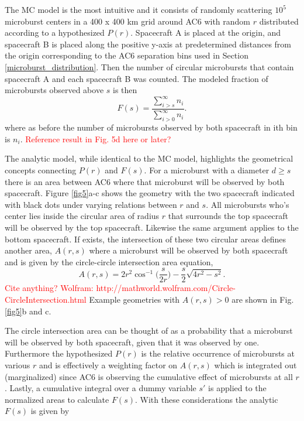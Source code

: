 \documentclass[draft]{agujournal2019}
\begin{document}
The MC model is the most intuitive and it consists of randomly scattering $10^5$ microburst centers in a 400 x 400 km grid around AC6 with random $r$ distributed according to a hypothesized $P(r)$. Spacecraft A is placed at the origin, and spacecraft B is placed along the positive y-axis at predetermined distances from the origin corresponding to the AC6 separation bins used in Section \ref{microburst_distribution}. Then the number of circular microbursts that contain spacecraft A and each spacecraft B was counted. The modeled fraction of microbursts observed above $s$ is then
\begin{equation}
F(s) = \frac{\displaystyle\sum_{i > s}^\infty n_{i} }{ \displaystyle\sum_{i > 0}^\infty n_{i} }.
\end{equation} where as before the number of microbursts observed by both spacecraft in ith bin is $n_{i}$. \textcolor{red}{Reference result in Fig. 5d here or later?}

The analytic model, while identical to the MC model, highlights the geometrical concepts connecting $P(r)$ and $F(s)$. For a microburst with a diameter $d \geq s$ there is an area between AC6 where that microburst will be observed by both spacecraft. Figure \ref{fig5}a-c shows the geometry with the two spacecraft indicated with black dots under varying relations between $r$ and $s$. All microbursts who's center lies inside the circular area of radius $r$ that surrounds the top spacecraft will be observed by the top spacecraft. Likewise the same argument applies to the bottom spacecraft. If exists, the intersection of these two circular areas defines another area, $A(r, s)$ where a microburst will be observed by both spacecraft and is given by the circle-circle intersection area equation, 
\begin{equation}
A(r, s) = 2r^2 \cos^{-1}{\Big( \frac{s}{2r} \Big)} - \frac{s}{2} \sqrt{4r^2 - s^2}.
\end{equation} \textcolor{red}{Cite anything? Wolfram: http://mathworld.wolfram.com/Circle-CircleIntersection.html} Example geometries with $A(r, s) > 0$ are shown in Fig. \ref{fig5}b and c.

The circle intersection area can be thought of as a probability that a microburst will be observed by both spacecraft, given that it was observed by one. Furthermore the hypothesized $P(r)$ is the relative occurrence of microbursts at various $r$ and is effectively a weighting factor on $A(r, s)$ which is integrated out (marginalized) since AC6 is observing the cumulative effect of microbursts at all $r$. Lastly, a cumulative integral over a dummy variable $s'$ is applied to the normalized areas to calculate $F(s)$. With these considerations the analytic $F(s)$ is given by
\end{document}
